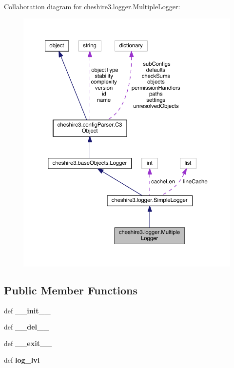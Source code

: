 Collaboration diagram for cheshire3.\-logger.\-Multiple\-Logger\-:
\nopagebreak
\begin{figure}[H]
\begin{center}
\leavevmode
\includegraphics[width=350pt]{classcheshire3_1_1logger_1_1_multiple_logger__coll__graph}
\end{center}
\end{figure}
\subsection*{Public Member Functions}
\begin{DoxyCompactItemize}
\item 
\hypertarget{classcheshire3_1_1logger_1_1_multiple_logger_a78ce01f87351f18f6247d43a2003b08c}{def {\bfseries \-\_\-\-\_\-init\-\_\-\-\_\-}}\label{classcheshire3_1_1logger_1_1_multiple_logger_a78ce01f87351f18f6247d43a2003b08c}

\item 
\hypertarget{classcheshire3_1_1logger_1_1_multiple_logger_adfcff1a33e3d4771a391708273815e03}{def {\bfseries \-\_\-\-\_\-del\-\_\-\-\_\-}}\label{classcheshire3_1_1logger_1_1_multiple_logger_adfcff1a33e3d4771a391708273815e03}

\item 
\hypertarget{classcheshire3_1_1logger_1_1_multiple_logger_aeb97443b6b928cb0f9d569ff6fdfdcb5}{def {\bfseries \-\_\-\-\_\-exit\-\_\-\-\_\-}}\label{classcheshire3_1_1logger_1_1_multiple_logger_aeb97443b6b928cb0f9d569ff6fdfdcb5}

\item 
\hypertarget{classcheshire3_1_1logger_1_1_multiple_logger_ad35caa97f8bd610221cb71604d8d877d}{def {\bfseries log\-\_\-lvl}}\label{classcheshire3_1_1logger_1_1_multiple_logger_ad35caa97f8bd610221cb71604d8d877d}

\end{DoxyCompactItemize}
